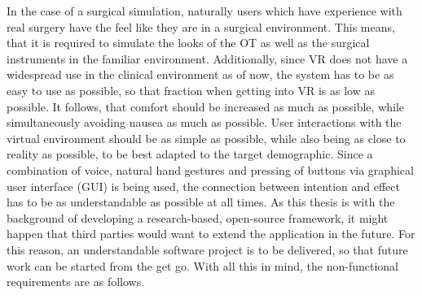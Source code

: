 In the case of a surgical simulation, naturally users which have experience with real surgery have the feel like they are in a surgical environment.
This means, that it is required to simulate the looks of the OT as well as the surgical instruments in the familiar environment.
Additionally, since VR does not have a widespread use in the clinical environment as of now, the system has to be as easy to use as possible, so that fraction when getting into VR is as low as possible.
It follows, that comfort should be increased as much as possible, while simultaneously avoiding nausea as much as possible.
User interactions with the virtual environment should be as simple as possible, while also being as close to reality as possible, to be best adapted to the target demographic.
Since a combination of voice, natural hand gestures and pressing of buttons via graphical user interface (GUI) is being used, the connection between intention and effect has to be as 
understandable as possible at all times.
As this thesis is with the background of developing a research-based, open-source framework, it might happen that third parties would want to extend the application in the future.
For this reason, an understandable software project is to be delivered, so that future work can be started from the get go.
With all this in mind, the non-functional requirements are as follows.


